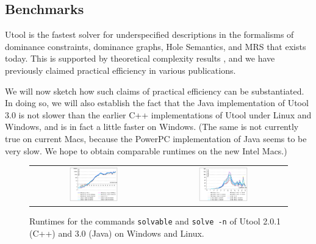 \subsection{Benchmarks}

Utool is the fastest solver for underspecified descriptions in the
formalisms of dominance constraints, dominance graphs, Hole Semantics,
and MRS that exists today. This is supported by theoretical complexity
results
\cite{Althaus-J.Algo.,bodirsky-weakly-normal-constraints,KolTha05b},
and we have previously claimed practical efficiency in various
publications.

We will now sketch how such claims of practical efficiency can be
substantiated. In doing so, we will also establish the fact that the
Java implementation of Utool 3.0 is not slower than the earlier C++
implementations of Utool under Linux and Windows, and is in fact a
little faster on Windows. (The same is not currently true on current
Macs, because the PowerPC implementation of Java seems to be very
slow. We hope to obtain comparable runtimes on the new Intel Macs.)

\begin{figure}
\begin{tabular}{cc}
\includegraphics[width=0.4\textwidth]{jh-extraction-mean}
&
\includegraphics[width=0.4\textwidth]{jh-chart-mean}
\end{tabular}
\caption{Runtimes for the commands \texttt{solvable} and \texttt{solve -n}
of Utool 2.0.1 (C++) and 3.0 (Java) on Windows and Linux. \label{fig:runtimes}}
\end{figure}

